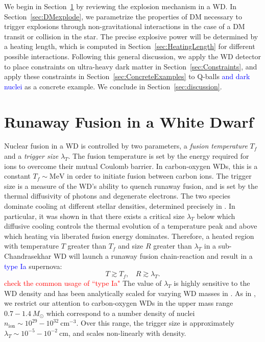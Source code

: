 \documentclass[twocolumn,showpacs,preprintnumbers,amsmath,amssymb,prd]{revtex4}
\newcommand{\MeV}{\text{MeV}}
\newcommand{\cm}{\text{cm}}
\begin{document}
We begin in Section~\ref{sec:Review} by reviewing the explosion mechanism in a WD. In Section~\ref{sec:DMexplode}, we parametrize the properties of DM necessary to trigger explosions through non-gravitational interactions in the case of a DM transit or collision in the star. The precise explosive power will be determined by a heating length, which is computed in Section~\ref{sec:HeatingLength} for different possible interactions. Following this general discussion, we apply the WD detector to place constraints on ultra-heavy dark matter in Section~\ref{sec:Constraints}, and apply these constraints in Section~\ref{sec:ConcreteExamples} to Q-balls \textcolor{blue}{and dark nuclei} as a concrete example. We conclude in Section~\ref{sec:discussion}.

\section{Runaway Fusion in a White Dwarf}
\label{sec:Review}

Nuclear fusion in a WD is controlled by two parameters, a \emph{fusion temperature} $T_f$ and a \emph{trigger size} $\lambda_T$.  The fusion temperature is set by the energy required for ions to overcome their mutual Coulomb barrier.  In carbon-oxygen WDs, this is a constant $T_f \sim \MeV$ in order to initiate fusion between carbon ions.  The trigger size is a measure of the WD's ability to quench runaway fusion, and is set by the thermal diffusivity of photons and degenerate electrons. The two species dominate cooling at different stellar densities, determined precisely in \cite{Woosley}. In particular, it was shown in \cite{Woosley} that there exists a critical size $\lambda_T$ below which diffusive cooling controls the thermal evolution of a temperature peak and above which heating via liberated fusion energy dominates. Therefore, a heated region with temperature $T$ greater than $T_f$ and size $R$ greater than $\lambda_T$ in a sub-Chandrasekhar WD will launch a runaway fusion chain-reaction and result in a \textcolor{blue}{type Ia} supernova:
\begin{equation}
\label{eq:runaway}
  T \gtrsim T_f, ~~~~ R \gtrsim \lambda_T.
\end{equation}
\textcolor{red}{check the common usage of ``type Ia"}  The value of $\lambda_T$ is highly sensitive to the WD density and has been analytically scaled for varying WD masses in \cite{Graham:2015apa}. As in \cite{Graham:2015apa}, we restrict our attention to carbon-oxygen WDs in the upper mass range $0.7 - 1.4 ~M_{\odot}$ which correspond to a number density of nuclei $n_\text{ion} \sim 10^{29} - 10^{32} ~\cm^{-3}$. Over this range, the trigger size is approximately $\lambda_T \sim 10^{-5} - 10^{-2} ~\text{cm}$, and scales non-linearly with density.
\end{document}
